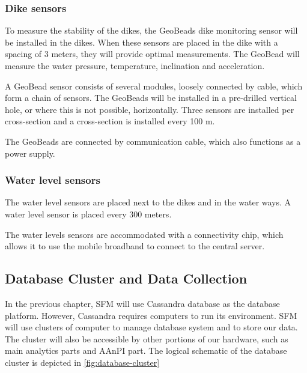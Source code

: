 \label{dikesensors}
\subsubsection{Dike sensors}
To measure the stability of the dikes, the GeoBeads dike monitoring sensor will be installed in the dikes. When these sensors are placed in the dike with a spacing of 3 meters, they will provide optimal measurements\cite{ng180levee}. The GeoBead will measure the water pressure, temperature, inclination and acceleration.

A GeoBead sensor consists of several modules, loosely connected by cable, which form a chain of sensors. The GeoBeads will be installed in a pre-drilled vertical hole, or where this is not possible, horizontally. Three sensors are installed per cross-section and a cross-section is installed every 100 m. 

The GeoBeads are connected by communication cable, which also functions as a power supply. 

\subsubsection{Water level sensors}
The water level sensors are placed next to the dikes and in the water ways. A water level sensor is placed every 300 meters. %

The water levels sensors are accommodated with a connectivity chip, which allows it to use the mobile broadband to connect to the central server.


\subsection{Database Cluster and Data Collection}
\label{subsec:database-data}
In the previous chapter, SFM will use Cassandra database as the database platform. However, Cassandra requires computers to run its environment. SFM will use clusters of computer to manage database system and to store our data. The cluster will also be accessible by other portions of our hardware, such as main analytics parts and AAnPI part. The logical schematic of the database cluster is depicted in \autoref{fig:database-cluster}

